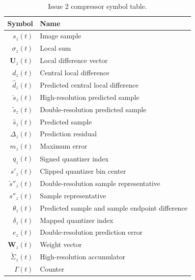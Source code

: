 \begin{table}[ht]
	\caption{Issue 2 compressor symbol table.}
	\label{tab:compressor-symbols}
	\begin{center}
		\begin{tabular}[c]{r|l}
			\hline
			\multicolumn{1}{r|}{\textbf{Symbol}} &
			\multicolumn{1}{l}{\textbf{Name}}                                                      \\
			\hline
			$s_z(t)$                             & Image sample                                    \\
			$\sigma_z(t)$                        & Local sum                                       \\
			$\mathbf{U}_z(t)$                    & Local difference vector                         \\
			${d}_z(t)$                           & Central local difference                        \\
			$\hat{d}_z(t)$                       & Predicted central local difference              \\
			$\breve{s}_z(t)$                     & High-resolution predicted sample                \\
			$\tilde{s}_z(t)$                     & Double-resolution predicted sample              \\
			$\hat{s}_z(t)$                       & Predicted sample                                \\
			$\Delta_z(t)$                        & Prediction residual                             \\
			$m_z(t)$                             & Maximum error                                   \\
			$q_z(t)$                             & Signed quantizer index                          \\
			$s'_z(t)$                            & Clipped quantizer bin center                    \\
			$\tilde{s}''_z(t)$                   & Double-resolution sample representative         \\
			$s''_z(t)$                           & Sample representative                           \\
			$\theta_z(t)$                        & Predicted sample and sample endpoint difference \\
			$\delta_z(t)$                        & Mapped quantizer index                          \\
			$e_z(t)$                             & Double-resolution prediction error              \\
			$\mathbf{W}_z(t)$                    & Weight vector                                   \\
			$\tilde{\Sigma}_z(t)$                & High-resolution accumulator                     \\
			$\Gamma(t)$                          & Counter                                         \\
			\hline
		\end{tabular}
	\end{center}
\end{table}

